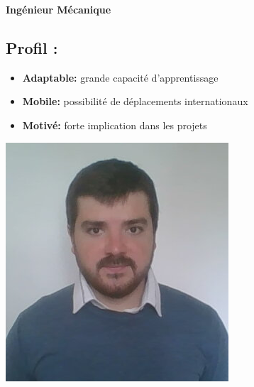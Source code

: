 \documentclass[10pt,a4paper,sans]{article}
\begin{document}

\begin{minipage}{0.36\textwidth}
    \vspace{0.30cm}
    
\end{minipage}
\begin{minipage}{0.62\textwidth}
    \begin{mdframed}[style=titre1]
        \begin{flushright}
            \Large{\textbf{Ingénieur Mécanique}}
        \end{flushright}
    \end{mdframed}
    \begin{minipage}{0.75\textwidth}
        \subsection{Profil :}
        \begin{itemize}
            \item{\textbf{Adaptable:} grande capacité d'apprentissage}
            \item{\textbf{Mobile:} possibilité de déplacements internationaux}
            \item{\textbf{Motivé:} forte implication dans les projets}
        \end{itemize}
    \end{minipage}
    \begin{minipage}{0.23\textwidth}
        \includegraphics[width=\textwidth]{img/image_CV.png}
    \end{minipage}
\end{minipage}
\end{document}
